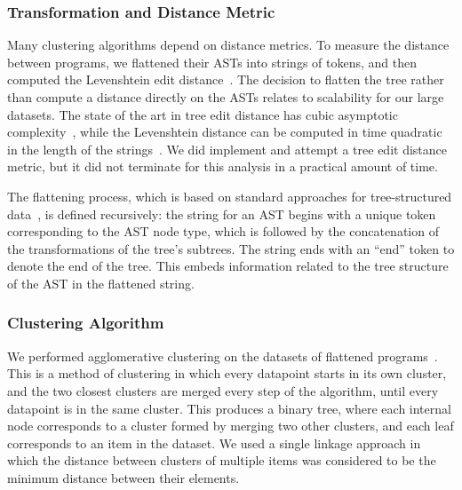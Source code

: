 \documentclass[conference]{IEEEtran}
\begin{document}

\subsubsection{Transformation and Distance Metric}

Many clustering algorithms depend on distance metrics.
To measure the distance between programs, we flattened their ASTs into
strings of tokens, and then computed the Levenshtein edit
distance~\cite{levenshtein}. The decision to flatten the tree rather than
compute a distance directly on the ASTs relates to scalability for our
large datasets. The state of the art in tree edit distance has cubic
asymptotic complexity~\cite{PAWLIK2016157}, while the Levenshtein distance
can be computed in time quadratic in the length of the
strings~\cite{lev-quadratic}. We did implement and attempt a tree edit
distance metric, but it did not terminate for this analysis in a practical
amount of time.

The flattening process, which is based on standard approaches for
tree-structured data~\cite{dist-site}, is defined recursively: the string
for an AST begins with a unique token corresponding to the AST node type,
which is followed by the concatenation of the transformations of the tree's
subtrees.  The string ends with an ``end'' token to denote the end of the
tree. This embeds information related to the tree structure of the AST in
the flattened string.

\subsubsection{Clustering Algorithm}

We performed agglomerative clustering on the
datasets of flattened programs~\cite{modern-clustering}.
This is a method of clustering in which every datapoint starts in its own
cluster, and the two closest clusters are merged every step of the algorithm,
until every datapoint is in the same cluster. This produces a binary tree, where
each internal node corresponds to a cluster formed by merging two other clusters,
and each leaf corresponds to an item in the dataset. We used a single linkage
approach in which the distance between clusters of multiple items was considered
to be the minimum distance between their elements.
\end{document}
